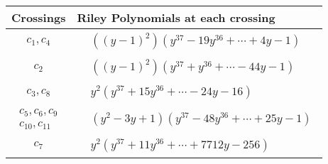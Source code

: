 \documentclass[1p]{elsarticle_modified}
\theoremstyle{definition}
\begin{document}
\begin{tabular}{m{50pt}|m{274pt}}
Crossings & \hspace{64pt}Riley Polynomials at each crossing \\
\hline $$\begin{aligned}c_{1},c_{4}\end{aligned}$$&$\begin{aligned}
&((y-1)^2)(y^{37}-19 y^{36}+\cdots+4 y-1)
\end{aligned}$\\
\hline $$\begin{aligned}c_{2}\end{aligned}$$&$\begin{aligned}
&((y-1)^2)(y^{37}+y^{36}+\cdots-44 y-1)
\end{aligned}$\\
\hline $$\begin{aligned}c_{3},c_{8}\end{aligned}$$&$\begin{aligned}
&y^2(y^{37}+15 y^{36}+\cdots-24 y-16)
\end{aligned}$\\
\hline $$\begin{aligned}c_{5},c_{6},c_{9}\\c_{10},c_{11}\end{aligned}$$&$\begin{aligned}
&(y^2-3 y+1)(y^{37}-48 y^{36}+\cdots+25 y-1)
\end{aligned}$\\
\hline $$\begin{aligned}c_{7}\end{aligned}$$&$\begin{aligned}
&y^2(y^{37}+11 y^{36}+\cdots+7712 y-256)
\end{aligned}$\\
\hline
\end{tabular}
\vskip 2pc
\end{document}
